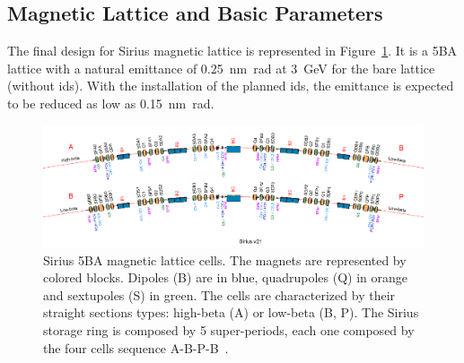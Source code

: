 \subsection{Magnetic Lattice and Basic Parameters}
The final design for Sirius magnetic lattice is represented in Figure~\ref{fig:sirius_lattice}. It is a 5BA lattice with a natural emittance of \SI{0.25}{\nano\meter\radian} at \SI{3}{\giga\electronvolt} for the bare lattice (without \glspl{id}). With the installation of the planned \glspl{id}, the emittance is expected to be reduced as low as \SI{0.15}{\nano\meter\radian}.
\begin{figure}
    \centering
    \includegraphics[width=\textwidth, trim={0 2cm 0 0}, clip]{figures/sirius_lattice.png}
    \caption{Sirius 5BA magnetic lattice cells. The magnets are represented by colored blocks. Dipoles (B) are in blue, quadrupoles (Q) in orange and sextupoles (S) in green. The cells are characterized by their straight sections types: high-beta (A) or low-beta (B, P). The Sirius storage ring is composed by 5 super-periods, each one composed by the four cells sequence A-B-P-B~\cite{wiki}.}
    \label{fig:sirius_lattice}
\end{figure}

